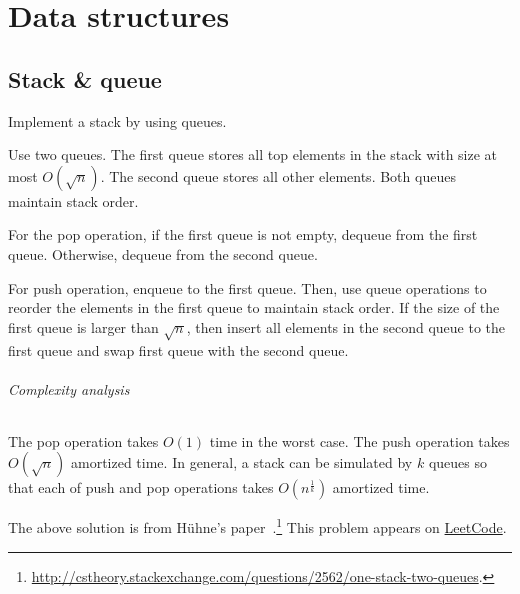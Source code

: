 \chapter{Data structures}

\section{Stack \& queue}
\begin{Exercise}[title=Implement a stack using queues]
Implement a stack by using queues.
\end{Exercise}
\begin{Answer}
Use two queues. 
The first queue stores all top elements in the stack with size at most $O(\sqrt{n})$. 
The second queue stores all other elements. 
Both queues maintain stack order. 

For the pop operation, if the first queue is not empty, dequeue from the first queue.
Otherwise, dequeue from the second queue.

For push operation, enqueue to the first queue. 
Then, use queue operations to reorder the elements in the first queue to maintain stack order. 
If the size of the first queue is larger than $\sqrt{n}$, then insert all elements in the second queue to the first queue and swap first queue with the second queue.

\subparagraph{Complexity analysis} The pop operation takes $O(1)$ time in the worst case. The push operation takes $O(\sqrt{n})$ amortized time.
In general, a stack can be simulated by $k$ queues so that each of push and pop operations takes $O(n^{\frac{1}{k}})$ amortized time.
\begin{remark}
The above solution is from H{\"{u}}hne's paper~\cite{Huhne1993}.\footnote{\url{http://cstheory.stackexchange.com/questions/2562/one-stack-two-queues}.} This problem appears on \href{https://leetcode.com/problems/implement-stack-using-queues/}{LeetCode}.
\end{remark}
\end{Answer}

